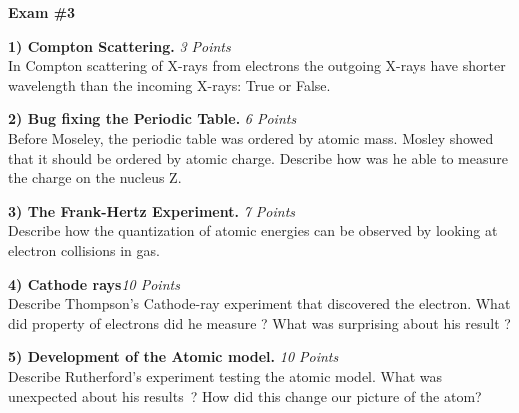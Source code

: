 



\thispagestyle{fancy}


\begin{center}
{\huge \textbf{Exam \#3}}
\large

\end{center}

{\large



\textbf{1) Compton Scattering. }\hfill \textit{3 Points}\\
In Compton scattering of X-rays from electrons the outgoing X-rays have shorter wavelength than the incoming X-rays: True or False.

\vspace*{0.4in}

\textbf{2) Bug fixing the Periodic Table. }\hfill \textit{6 Points}\\
Before Moseley, the periodic table was ordered by atomic mass. Mosley showed that it should be ordered by atomic charge.  Describe how was he able to measure the charge on the nucleus Z.

\vfill

\textbf{3) The Frank-Hertz Experiment. }\hfill \textit{7 Points}\\
Describe how the quantization of atomic energies can be observed by looking at electron collisions in gas.

\vfill

\clearpage

\textbf{4) Cathode rays}\hfill \textit{10 Points}\\
Describe Thompson's Cathode-ray experiment that discovered the electron.
What did property of electrons did he measure ?
What was surprising about his result ?

\vspace*{3.4in}

\begin{minipage}{\textwidth}
\textbf{5) Development of the Atomic model. }\hfill \textit{10 Points}\\
Describe Rutherford's experiment testing the atomic model.
What was unexpected about his results~?
How did this change our picture of the atom?
\end{minipage}

}
